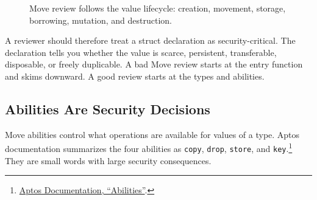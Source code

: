 \begin{figure}[htbp]
\centering
{}
\caption{Move review follows the value lifecycle: creation, movement, storage, borrowing, mutation, and destruction.}
\end{figure}

A reviewer should therefore treat a struct declaration as security-critical. The declaration tells you whether the value is scarce, persistent, transferable, disposable, or freely duplicable. A bad Move review starts at the entry function and skims downward. A good review starts at the types and abilities.

\subsection{Abilities Are Security Decisions}

Move abilities control what operations are available for values of a type. Aptos documentation summarizes the four abilities as \texttt{copy}, \texttt{drop}, \texttt{store}, and \texttt{key}.\footnote{\href{https://aptos.dev/build/smart-contracts/book/abilities}{Aptos Documentation, ``Abilities''}.} They are small words with large security consequences.

